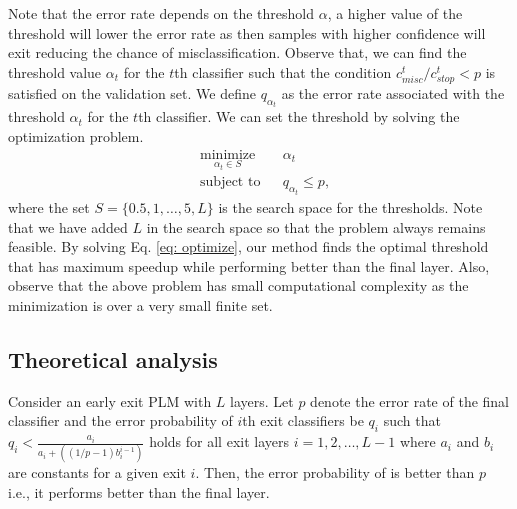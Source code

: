 Note that the error rate depends on the threshold $\alpha$, a higher value of the threshold will lower the error rate as then samples with higher confidence will exit reducing the chance of misclassification.
Observe that, we can find the threshold value $\alpha_t$ for the $t$th classifier such that the condition $c_{misc}^t/c_{stop}^t<p$ is satisfied on the validation set.
We define $q_{\alpha_{t}}$ as the error rate associated with the threshold $\alpha_t$ for the $t$th classifier. We can set the threshold by solving the optimization problem.
\begin{equation}\label{eq: optimize}
\begin{aligned}
& \underset{\alpha_t\in S}{\text{minimize}}
& & \alpha_t \\
& \text{subject to}
& & q_{\alpha_t} \leq p,
\end{aligned}
\end{equation}
where the set $S = \{0.5, 1, \ldots, 5, L\}$ is the search space for the thresholds. Note that we have added $L$ in the search space so that the problem always remains feasible. By solving Eq. \ref{eq: optimize}, our method finds the optimal threshold that has maximum speedup while performing better than the final layer. Also, observe that the above problem has small computational complexity as the minimization is over a very small finite set. 

\subsection{Theoretical analysis}\label{sec: theore_analy}
\begin{theorem}\label{thm:theorem 1}
Consider an early exit PLM with $L$ layers. Let $p$ denote the error rate of the final classifier and the error probability of $i$th exit classifiers be $q_i$ such that $q_i<\frac{a_i}{a_i+((1/p-1)b_i^{i-1})}$ holds for all exit layers $i=1,2,\ldots, L-1$ where $a_i$ and $b_i$ are constants for a given exit $i$. Then, the error probability of \algo{} is better than $p$ i.e., it performs better than the final layer.
\end{theorem}

